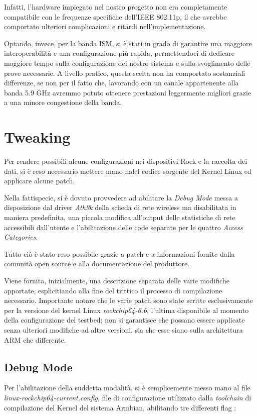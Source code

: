 Infatti, l'hardware impiegato nel nostro progetto non era completamente compatibile con le frequenze specifiche dell'IEEE 802.11p, il che avrebbe comportato ulteriori complicazioni e ritardi nell'implementazione.

Optando, invece, per la banda ISM, si è stati in grado di garantire una maggiore interoperabilità e una configurazione più rapida, permettendoci di dedicare maggiore tempo sulla configurazione del nostro sistema e sullo svoglimento delle prove necessarie. A livello pratico, questa scelta non ha comportato sostanziali differenze, se non per il fatto che, lavorando con un canale appartenente alla banda 5.9 GHz avremmo potuto ottenere prestazioni leggermente migliori grazie a una minore congestione della banda.

\section{Tweaking}
Per rendere possibili alcune configurazioni nei dispositivi Rock e la raccolta dei dati, si è reso necessario mettere mano nalel codice sorgente del Kernel Linux ed applicare alcune patch.

Nella fattispecie, si è dovuto provvedere ad abilitare la \textit{Debug Mode} messa a disposizione dal driver \textit{Ath9k} della scheda di rete wireless ma disabilitata in maniera predefinita, una piccola modifica all'output delle statistiche di rete accessibili dall'utente e l'abilitazione delle code separate per le quattro \textit{Access Categories}.

Tutto ciò è stato reso possibile grazie a patch e a informazioni fornite dalla comunità open source e alla documentazione del produttore.

Viene fornita, inizialmente, una descrizione separata delle varie modifiche apportate, esplicitiando alla fine del trittico il processo di compilazione necessario. Importante notare che le varie patch sono state scritte esclusivamente per la versione del kernel Linux \textit{rockchip64-6.6}, l'ultima disponibile al momento della configurazione del testbed; non si garantisce che possano essere applicate senza ulteriori modifiche ad altre versioni, sia che esse siano sulla architettura ARM che differente.

\subsection[Debug Mode]{Debug Mode}
Per l'abilitazione della suddetta modalità, si è semplicemente messo mano al file \textit{linux-rockchip64-current.config}, file di configurazione utilizzato dalla \textit{toolchain} di compilazione del Kernel del sistema Armbian, abilitando tre differenti flag \cite{linux_wireless}:

